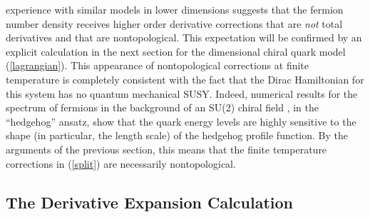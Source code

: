 \documentclass[a4paper,prd,showpacs,showkeys]{revtex4}
\begin{document}
experience with similar models in lower dimensions \cite{dunne,nonlinearsigma} suggests that the fermion number density \coordHE{} receives higher order derivative corrections that are {\it not} total derivatives and that are nontopological. This expectation will be confirmed by an explicit calculation in the next section for the \coordHE{} dimensional chiral quark model (\ref{lagrangian}). This appearance of nontopological corrections at finite temperature is completely consistent with the fact that the Dirac Hamiltonian for this system has no quantum mechanical SUSY. Indeed, numerical results \cite{ripka,kahana} for the spectrum of fermions in the background of an SU(2) chiral field \coordHE{}, in the ``hedgehog'' ansatz, show that the quark energy levels are highly sensitive to the shape (in particular, the length scale) of the hedgehog profile function. By the arguments of the previous section, this means that the finite temperature corrections in (\ref{split}) are necessarily  nontopological.
 
\subsection{The Derivative Expansion Calculation}
\end{document}
